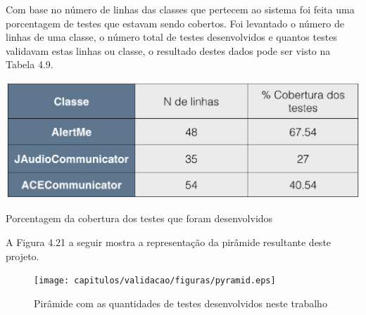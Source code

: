 Com base no número de linhas das classes que pertecem ao sistema foi feita uma porcentagem de testes que estavam sendo cobertos. Foi levantado o número de linhas de uma classe, o número total de testes desenvolvidos e quantos testes validavam estas linhas ou classe, o resultado destes dados pode ser visto na Tabela 4.9.

\begin{table}[H]
	\centering
	\captionsetup{justification=centering,margin=2cm}
	\includegraphics[scale=0.55]{capitulos/validacao/figuras/dadosObj2.eps}
	\caption{Porcentagem da cobertura dos testes que foram desenvolvidos}
	\label{fig:result-engajamento}
\end{table}

A Figura 4.21 a seguir mostra a representação da pirâmide resultante deste projeto. 

\begin{figure}[H]
	\centering
	\captionsetup{justification=centering,margin=2cm}
	\texttt{[image: capitulos/validacao/figuras/pyramid.eps]}
	\caption{Pirâmide com as quantidades de testes desenvolvidos neste trabalho}
	\label{fig:result-engajamento}
\end{figure}

